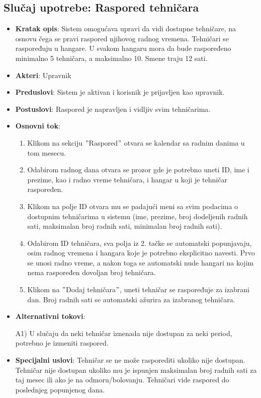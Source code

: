 \documentclass[a4paper]{article}
\begin{document}
\subsection{Slučaj upotrebe: Raspored tehničara}
\label{subsec:raspored_tehnicara}
\begin{itemize}
    \item \textbf{Kratak opis}: Sistem omogućava upravi da vidi dostupne tehničare, na osnovu čega se pravi raspored njihovog radnog vremena. Tehničari se raspoređuju u hangare. U svakom hangaru mora da bude raspoređeno minimalno 5 tehničara, a maksimalno 10. Smene traju 12 sati.
    \item \textbf{Akteri}: Upravnik
    \item \textbf{Preduslovi}: Sistem je aktivan i korisnik je prijavljen kao upravnik.
    \item \textbf{Postuslovi}: Raspored je napravljen i vidljiv svim tehničarima.
    \item \textbf{Osnovni tok}:
        \begin{enumerate}
            \item Klikom na sekciju $"$Raspored$"$ otvara se kalendar sa radnim danima u tom mesecu.
            \item Odabirom radnog dana otvara se prozor gde je potrebno uneti ID, ime i prezime, kao i radno vreme tehničara, i hangar u koji je tehničar raspoređen.
            \item Klikom na polje ID otvara mu se padajući meni sa svim podacima o dostupnim tehničarima u sistemu (ime, prezime, broj dodeljenih radnih sati, maksimalan broj radnih sati, minimalan broj radnih sati).
            \item Odabirom ID tehničara, sva polja iz 2. tačke se automatski popunjavaju, osim radnog vremena i hangara koje je potrebno eksplicitno navesti. Prvo se unosi radno vreme, a nakon toga se automatski nude hangari na kojim nema raspoređen dovoljan broj tehničara.
            \item Klikom na $"$Dodaj tehničara$"$, uneti tehničar se raspoređuje za izabrani dan. Broj radnih sati se automatski ažurira za izabranog tehničara.
        \end{enumerate}
    \item \textbf{Alternativni tokovi}:
        \begin{enumerate}
            A1) U slučaju da neki tehničar iznenada nije dostupan za neki period, potrebno je izmeniti raspored.
        \end{enumerate}
    \item \textbf{Specijalni uslovi}: Tehničar se ne može rasporediti ukoliko nije dostupan. Tehničar nije dostupan ukoliko mu je ispunjen maksimalan broj radnih sati za taj mesec ili ako je na odmoru/bolovanju. Tehničari vide raspored do poslednjeg popunjenog dana.
\end{itemize}
\end{document}
